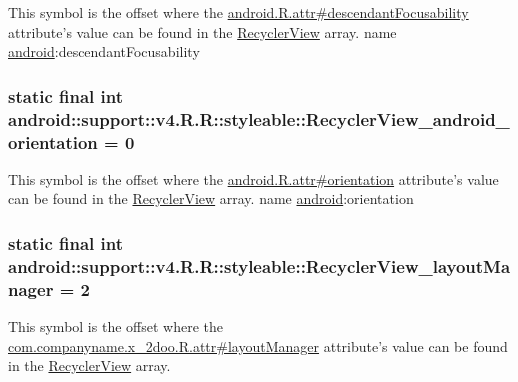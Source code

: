 This symbol is the offset where the \hyperlink{}{android.R.attr\#descendantFocusability} attribute's value can be found in the \hyperlink{classandroid_1_1support_1_1v4_1_1_r_1_1styleable_2cdeae02a2aae8e03f8765ed3a43caf5}{RecyclerView} array.  name \hyperlink{namespaceandroid}{android}:descendantFocusability \hypertarget{classandroid_1_1support_1_1v4_1_1_r_1_1styleable_e008924d6df8616aad567584258f56bf}{
\subsubsection[{RecyclerView\_\-android\_\-orientation}]{\setlength{\rightskip}{0pt plus 5cm}static final int android::support::v4.R.R::styleable::RecyclerView\_\-android\_\-orientation = 0}}
\label{classandroid_1_1support_1_1v4_1_1_r_1_1styleable_e008924d6df8616aad567584258f56bf}


This symbol is the offset where the \hyperlink{}{android.R.attr\#orientation} attribute's value can be found in the \hyperlink{classandroid_1_1support_1_1v4_1_1_r_1_1styleable_2cdeae02a2aae8e03f8765ed3a43caf5}{RecyclerView} array.  name \hyperlink{namespaceandroid}{android}:orientation \hypertarget{classandroid_1_1support_1_1v4_1_1_r_1_1styleable_fb053f97984703efea988f5a33cc13a8}{
\subsubsection[{RecyclerView\_\-layoutManager}]{\setlength{\rightskip}{0pt plus 5cm}static final int android::support::v4.R.R::styleable::RecyclerView\_\-layoutManager = 2}}
\label{classandroid_1_1support_1_1v4_1_1_r_1_1styleable_fb053f97984703efea988f5a33cc13a8}


This symbol is the offset where the \hyperlink{classcom_1_1companyname_1_1x__2doo_1_1_r_1_1attr_7436f659215fa9322f2083024664d1b9}{com.companyname.x\_\-2doo.R.attr\#layoutManager} attribute's value can be found in the \hyperlink{classandroid_1_1support_1_1v4_1_1_r_1_1styleable_2cdeae02a2aae8e03f8765ed3a43caf5}{RecyclerView} array.

